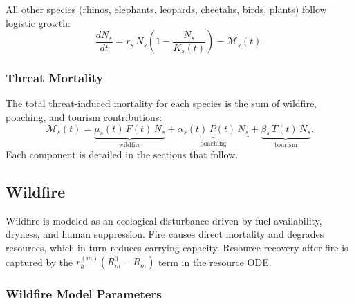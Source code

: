 All other species (rhinos, elephants, leopards, cheetahs, birds, plants) follow logistic growth:
\[
\frac{dN_s}{dt} = r_s\, N_s\!\left(1 - \frac{N_s}{K_s(t)}\right) - \mathcal{M}_s(t).
\]

\subsubsection{Threat Mortality}

The total threat-induced mortality for each species is the sum of wildfire, poaching, and tourism contributions:
\[
\mathcal{M}_s(t) = \underbrace{\mu_s(t)\,F(t)\,N_s}_{\text{wildfire}} + \underbrace{\alpha_s(t)\,P(t)\,N_s}_{\text{poaching}} + \underbrace{\beta_s\,T(t)\,N_s}_{\text{tourism}}.
\]
Each component is detailed in the sections that follow.

\subsection{Wildfire}
\label{sec:wildfire}

Wildfire is modeled as an ecological disturbance driven by fuel availability, dryness, and human suppression. Fire causes direct mortality and degrades resources, which in turn reduces carrying capacity. Resource recovery after fire is captured by the $r_h^{(m)}(R_m^0 - R_m)$ term in the resource ODE.

\subsubsection{Wildfire Model Parameters}

